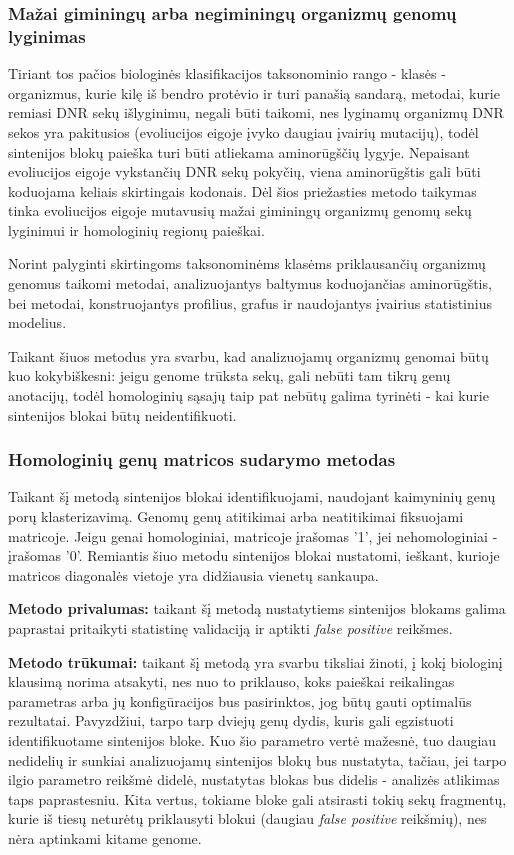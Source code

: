 \documentclass[12pt]{article}
\begin{document}
\subsubsection{Mažai giminingų arba negiminingų organizmų genomų lyginimas}
Tiriant tos pačios biologinės klasifikacijos taksonominio rango - klasės -
organizmus, kurie kilę iš bendro protėvio ir turi panašią sandarą, metodai, 
kurie remiasi DNR sekų išlyginimu, negali būti taikomi, nes lyginamų organizmų
DNR sekos yra pakitusios (evoliucijos eigoje įvyko daugiau įvairių mutacijų),
todėl sintenijos blokų paieška turi būti atliekama aminorūgščių
lygyje\cite{ARTICLE2}.
Nepaisant evoliucijos eigoje vykstančių DNR sekų pokyčių, viena aminorūgštis
gali būti koduojama keliais skirtingais kodonais. Dėl šios priežasties metodo
taikymas tinka evoliucijos eigoje mutavusių mažai giminingų organizmų genomų
sekų lyginimui ir homologinių regionų paieškai.

Norint palyginti skirtingoms taksonominėms klasėms priklausančių organizmų
genomus taikomi metodai, analizuojantys baltymus koduojančias aminorūgštis,
bei metodai, konstruojantys profilius, grafus ir naudojantys įvairius
statistinius modelius.

Taikant šiuos metodus yra svarbu, kad analizuojamų organizmų genomai būtų kuo
kokybiškesni: jeigu genome trūksta sekų, gali nebūti tam tikrų genų anotacijų,
todėl homologinių sąsajų taip pat nebūtų galima tyrinėti - kai kurie sintenijos
blokai būtų neidentifikuoti\cite{ARTICLE2}.

\subsubsection*{Homologinių genų matricos sudarymo metodas}
Taikant šį metodą\cite{ARTICLE2} sintenijos blokai identifikuojami, naudojant
kaimyninių genų porų klasterizavimą. Genomų genų atitikimai arba neatitikimai
fiksuojami matricoje. Jeigu genai homologiniai, matricoje įrašomas '1', jei
nehomologiniai - įrašomas '0'. Remiantis šiuo metodu sintenijos blokai
nustatomi, ieškant, kurioje matricos diagonalės vietoje yra didžiausia vienetų
sankaupa.

\textbf{Metodo privalumas:} taikant šį metodą nustatytiems sintenijos blokams
galima paprastai pritaikyti statistinę validaciją ir aptikti
\emph{false positive} reikšmes.

\textbf{Metodo trūkumai:} taikant šį metodą yra svarbu tiksliai žinoti, į kokį
biologinį klausimą norima atsakyti, nes nuo to priklauso, koks paieškai
reikalingas parametras arba jų konfigūracijos bus pasirinktos, jog būtų gauti
optimalūs rezultatai. Pavyzdžiui, tarpo tarp dviejų genų dydis, kuris gali
egzistuoti identifikuotame sintenijos bloke. Kuo šio parametro vertė mažesnė,
tuo daugiau nedidelių ir sunkiai analizuojamų sintenijos blokų bus nustatyta,
tačiau, jei tarpo ilgio parametro reikšmė didelė, nustatytas blokas bus didelis
- analizės atlikimas taps paprastesniu. Kita vertus, tokiame bloke gali
atsirasti tokių sekų fragmentų, kurie iš tiesų neturėtų priklausyti blokui
(daugiau \emph{false positive} reikšmių), nes nėra aptinkami kitame genome.
\end{document}
